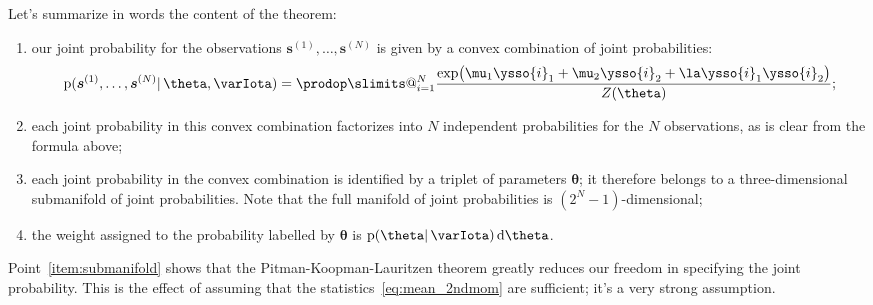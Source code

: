 \documentclass[\ifafour a4paper,12pt,\else a5paper,10pt,\fi%
onecolumn,oneside,article,%
british%
]{memoir}
\makeatletter
\theoremstyle{remark}
\theoremstyle{innote}
\def\prod{\DOTSI\prodop\slimits@}
\newcommand*{\di}{\mathrm{d}}%
\newcommand*{\pf}{\mathrm{p}}%
\renewcommand*{\|}{\mathpunct{|}}
\newcommand*{\yI}{\varIota}
\newcommand*{\ys}{\bm{s}}
\newcommand*{\yth}{\bm{\theta}}
\newcommand*{\yso}[1]{\ys^{(#1)}}
\makeatother
\begin{document}
Let's summarize in words the content
of the theorem:
\begin{enumerate}[label=(\textit{\alph*})]
\item our joint probability for the observations $\yso{1}, \dotsc,\yso{N}$
  is given by a convex combination of joint probabilities:
  \begin{equation}
    \label{eq:component_combination}
  \pf(\yso{1}, \dotsc, \yso{N} \|\yth, \yI )
  =
  \prod_{i=1}^{N}
  \frac{  \exp\bigl(
    \mu_1 \ysso{i}_1 + \mu_2 \ysso{i}_2 + \la \ysso{i}_1 \ysso{i}_2
    \bigr) }{Z(\yth)};
  \end{equation}

\item each joint probability in this convex combination factorizes into $N$
  independent probabilities for the $N$ observations, as is clear from the
  formula above;
\item\label{item:submanifold}each joint probability in the convex
  combination is identified by a triplet of parameters $\yth$; it therefore
  belongs to a three-dimensional submanifold of joint probabilities. Note
  that the full manifold of joint probabilities is $(2^N-1)$-dimensional;
\item\label{item:weights}the weight assigned to the probability labelled by
  $\yth$ is $\pf(\yth \|\yI)\,\di\yth$.
\end{enumerate}

Point~\ref{item:submanifold} shows that the Pitman-Koopman-Lauritzen
theorem greatly reduces our freedom in specifying the joint probability.
This is the effect of assuming that the statistics~\eqref{eq:mean_2ndmom}
are sufficient; it's a very strong assumption.
\end{document}
